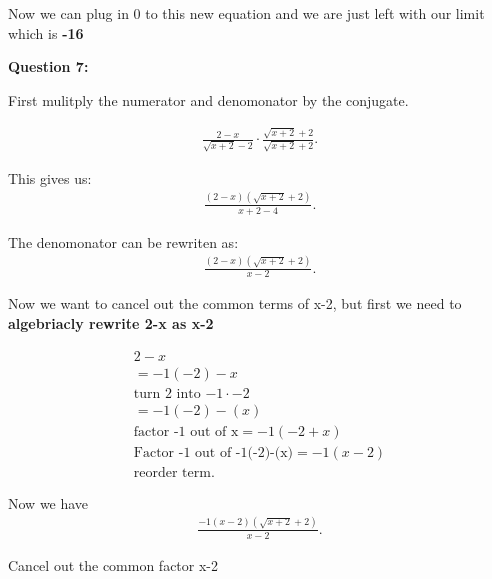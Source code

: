 \documentclass{report}
\begin{document}
    \bigbreak \noindent 
    Now we can plug in 0 to this new equation and we are just left with our limit which is \textbf{-16}

    \pagebreak
    \begin{Large}
       \noindent \textbf{Question 7:} 
    \end{Large}
    
    \bigbreak \noindent 
    
    \noindent First mulitply the numerator and denomonator by the conjugate.

    \begin{align*}
        \frac{2-x}{\sqrt{x+2} -2} \cdot \frac{\sqrt{x+2}+2}{\sqrt{x+2}+2}
    .\end{align*}

    \bigbreak \noindent 
    This gives us:
    \begin{align*}
        \frac{ \left(2-x\right) \left(\sqrt{x+2}+2\right)}{x+2-4}
    .\end{align*}

    \bigbreak \noindent 
    The denomonator can be rewriten as:
    \begin{align*}
        \frac{ \left(2-x\right) \left(\sqrt{x+2}+2\right)}{x-2}
    .\end{align*}

    \bigbreak \noindent 
    Now we want to cancel out the common terms of x-2, but first we need to
    \textbf{algebriacly rewrite 2-x as x-2} 

    \begin{align*}
        2-x \\ 
        = -1 \left(-2\right) - x \\
        \text{turn 2 into $-1 \cdot -2$} \\
        = -1 \left(-2\right) - \left(x\right) \\
        \text{factor -1 out of x}
        = -1 \left(-2 + x\right) \\
        \text{Factor -1 out of -1(-2)-(x)}
        = -1 \left(x-2\right) \\
        \text{reorder term}
    .\end{align*}

    \bigbreak \noindent 
    Now we have 
    \begin{align*}
        \frac{-1 \left(x-2\right) \left(\sqrt{x+2}+2\right)}{x-2}
    .\end{align*}

    \bigbreak \noindent 
    Cancel out the common factor x-2
\end{document}
